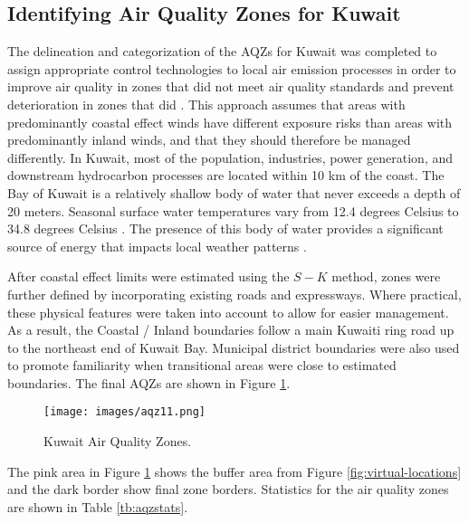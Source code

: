 \subsection{Identifying Air Quality Zones for Kuwait}

 The delineation and categorization of the AQZs for Kuwait was completed to assign appropriate control technologies to local air emission processes in order to improve air quality in zones that did not meet air quality standards and prevent deterioration in zones that did \citep{Carr2012}. This approach assumes that areas with predominantly coastal effect winds have different exposure risks than areas with predominantly inland winds, and that they should therefore be managed differently.  In Kuwait, most of the population, industries, power generation, and downstream hydrocarbon processes are located within 10 km of the coast.  The Bay of Kuwait is a relatively shallow body of water that never exceeds a depth of 20 meters.  Seasonal surface water temperatures vary from 12.4 degrees Celsius to 34.8 degrees Celsius \citep{Al-Mutairi2014}.  The presence of this body of water provides a significant source of energy that impacts local weather patterns \citep{Mizak2007,Panin2005}. 

After coastal effect limits were estimated using the $S-K$ method, zones were further defined by incorporating existing roads and expressways.  Where practical, these physical features were taken into account to allow for easier management.  As a result, the Coastal / Inland boundaries follow a main Kuwaiti ring road up to the northeast end of Kuwait Bay.  Municipal district boundaries were also used to promote familiarity when transitional areas were close to estimated boundaries.  The final AQZs are shown in Figure \ref{fig:kuwaitzones}.

%
\begin{figure}[!htb]
\texttt{[image: images/aqz11.png]} 
\caption{Kuwait Air Quality Zones.}
\label{fig:kuwaitzones}
\end{figure}
%

The pink area in Figure \ref{fig:kuwaitzones} shows the buffer area from Figure \ref{fig:virtual-locations} and the dark border show final zone borders. Statistics for the air quality zones are shown in Table \ref{tb:aqzstats}.

